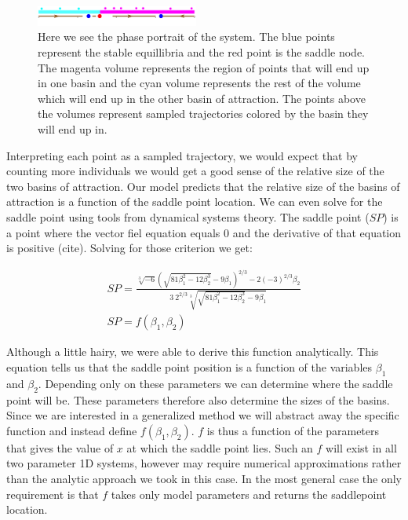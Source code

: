 \documentclass[letterpaper]{article}
\begin{document}
\begin{figure}[t]
\begin{center}
\includegraphics[width=2.1in,angle=0]{./basins.png}
\caption{Here we see the phase portrait of the system. The blue points represent
the stable equillibria and the red point is the saddle node. The magenta volume
represents the region of points that will end up in one basin and the cyan volume
represents the rest of the volume which will end up in the other basin of attraction.
The points above the volumes represent sampled trajectories colored by the basin they will
end up in.}
\label{fig2}
\end{center}
\end{figure}

Interpreting each point as a sampled trajectory, we would expect that by 
counting more individuals we would
get a good sense of the relative size of the two basins of attraction. Our model
predicts that the relative size of the basins of attraction is a function of the saddle
point location. We can even solve for the saddle
point using tools from dynamical systems theory. The saddle point ($SP$) is a point where the
vector fiel equation equals 0 and the derivative of that equation is positive (cite).
Solving for those criterion we get:

\begin{eqnarray}
SP = \frac{\sqrt[3]{-6} 
\left(\sqrt{81 \beta_1^2-12 \beta_2^3}-9 \beta_1\right)^{2/3}-2 
(-3)^{2/3} \beta_2}{3\ 2^{2/3} \sqrt[3]
{\sqrt{81 \beta_1^2-12 \beta_2^3}-9 \beta_1}}\\
    SP = f(\beta_1,\beta_2)
\end{eqnarray}

Although a little hairy, we were able to derive this function analytically.
This equation tells us that the saddle point position is a 
function of the variables $\beta_1$ and $\beta_2$. 
Depending only on these parameters we
can determine where the saddle point will be. These parameters therefore also determine
the sizes of the basins. Since we are interested in a generalized method we will abstract 
away the specific function and instead define $f(\beta_1,\beta_2)$.
$f$ is thus a function of the parameters that gives the value of $x$ at which the
saddle point lies. Such an $f$ will exist
in all two parameter 1D systems, however may require numerical approximations rather than
the analytic approach we took in this case. In the most general case the only 
requirement is that $f$ takes only
model parameters and returns the saddlepoint location.
\end{document}
